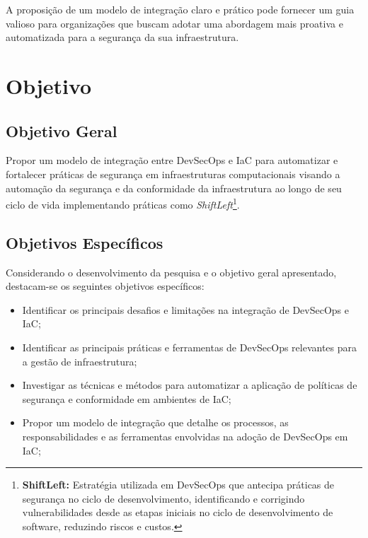 A proposição de um modelo de integração claro e prático pode fornecer um guia valioso para organizações que buscam adotar uma abordagem mais proativa e automatizada para a segurança da sua infraestrutura.


\section{Objetivo}
\subsection{Objetivo Geral}

Propor um modelo de integração entre DevSecOps e IaC para automatizar e fortalecer
práticas de segurança em infraestruturas computacionais visando a automação da segurança e da conformidade da infraestrutura ao longo de seu ciclo de vida implementando práticas como \textit{ShiftLeft}\footnote{\textbf{ShiftLeft:}  Estratégia utilizada em DevSecOps que antecipa práticas de segurança no ciclo de desenvolvimento, identificando e corrigindo vulnerabilidades desde as etapas iniciais no ciclo de desenvolvimento de software, reduzindo riscos e custos.}.



\subsection{Objetivos Específicos}

Considerando o desenvolvimento da pesquisa e o objetivo geral apresentado, destacam-se os seguintes objetivos específicos:

\begin{itemize}
	\item Identificar os principais desafios e limitações na integração de DevSecOps e IaC;
	\item Identificar as principais práticas e ferramentas de DevSecOps relevantes para a gestão de infraestrutura;
	\item Investigar as técnicas e métodos para automatizar a aplicação de políticas de segurança e conformidade em ambientes de IaC;
	\item Propor um modelo de integração que detalhe os processos, as responsabilidades e as ferramentas envolvidas na adoção de DevSecOps em IaC;

\end{itemize}

